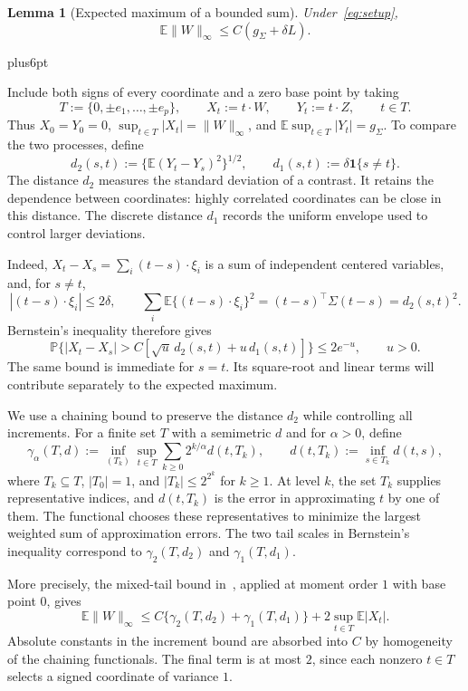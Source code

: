 \documentclass[11pt,letterpaper,twoside,leqno]{article}
\makeatletter
\theoremstyle{bookplain}
\newtheorem{lemma}{Lemma}
\theoremstyle{bookremark}
\renewenvironment{proof}[1][\proofname]{\par
  \pushQED{\qed}\normalfont\topsep6pt plus6pt\relax
  \trivlist\item[\hskip\labelsep\bfseries #1\@addpunct{.}]\ignorespaces
}{\popQED\endtrivlist\@endpefalse}
\newcommand{\E}{\mathbb E}
\newcommand{\Pp}{\mathbb P}
\newcommand{\ind}{\mathbf 1}
\makeatother
\begin{document}
\begin{lemma}[Expected maximum of a bounded sum]
\label{intrinsic:lem:maximum}
Under~\eqref{eq:setup},
\begin{equation}\label{intrinsic:eq:maximum}
 \E\|W\|_\infty\le C(g_\Sigma+\delta L).
\end{equation}
\end{lemma}

\begin{proof}
Include both signs of every coordinate and a zero base point by
taking
\[
 T:=\{0,\pm e_1,\ldots,\pm e_p\},\qquad
 X_t:=t\cdot W,\qquad Y_t:=t\cdot Z,\qquad t\in T.
\]
Thus $X_0=Y_0=0$,
$\sup_{t\in T}|X_t|=\|W\|_\infty$, and
$\E\sup_{t\in T}|Y_t|=g_\Sigma$.
To compare the two processes, define
\[
 d_2(s,t):=\{\E(Y_t-Y_s)^2\}^{1/2},
 \qquad d_1(s,t):=\delta\ind\{s\ne t\}.
\]
The distance $d_2$ measures the standard deviation of a contrast.
It retains the dependence between coordinates: highly correlated
coordinates can be close in this distance. The discrete distance
$d_1$ records the uniform envelope used to control larger deviations.

Indeed, $X_t-X_s=\sum_i(t-s)\cdot\xi_i$ is a sum of independent
centered variables, and, for $s\ne t$,
\[
 |(t-s)\cdot\xi_i|\le2\delta,\qquad
 \sum_i\E\{(t-s)\cdot\xi_i\}^2
 =(t-s)^\top\Sigma(t-s)=d_2(s,t)^2.
\]
Bernstein's inequality therefore gives
\[
 \Pp\{|X_t-X_s|>C[\sqrt u\,d_2(s,t)+u\,d_1(s,t)]\}
 \le2e^{-u},\qquad u>0.
\]
The same bound is immediate for $s=t$. Its square-root and linear
terms will contribute separately to the expected maximum.

We use a chaining bound to preserve the distance $d_2$ while
controlling all increments. For a finite set $T$ with a semimetric
$d$ and for $\alpha>0$, define
\[
 \gamma_\alpha(T,d):=
 \inf_{(T_k)}\sup_{t\in T}
       \sum_{k\ge0}2^{k/\alpha}d(t,T_k),
 \qquad d(t,T_k):=\inf_{s\in T_k}d(t,s),
\]
where $T_k\subseteq T$, $|T_0|=1$, and
$|T_k|\le2^{2^k}$ for $k\ge1$.
At level $k$, the set $T_k$ supplies representative indices,
and $d(t,T_k)$ is the error in approximating $t$ by one of them.
The functional chooses these representatives to minimize the
largest weighted sum of approximation errors.
The two tail scales in Bernstein's inequality correspond to
$\gamma_2(T,d_2)$ and $\gamma_1(T,d_1)$.

More precisely, the mixed-tail bound
in~\cite[Theorem~3.5]{Dirksen2015}, applied at moment order $1$
with base point $0$, gives
\[
 \E\|W\|_\infty
 \le C\{\gamma_2(T,d_2)+\gamma_1(T,d_1)\}
       +2\sup_{t\in T}\E|X_t|.
\]
Absolute constants in the increment bound are absorbed into $C$
by homogeneity of the chaining functionals. The final term is at
most $2$, since each nonzero $t\in T$ selects a signed coordinate
of variance $1$.


\end{proof}
\end{document}
